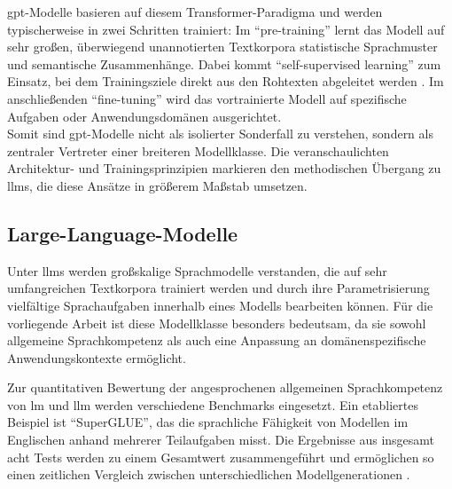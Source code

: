 \gls{gpt}-Modelle basieren auf diesem Transformer-Paradigma und werden typischerweise in zwei Schritten trainiert: 
Im \enquote{pre-training} lernt das Modell auf sehr großen, überwiegend unannotierten Textkorpora statistische Sprachmuster und semantische Zusammenhänge. 
Dabei kommt \enquote{self-supervised learning} zum Einsatz, bei dem Trainingsziele direkt aus den Rohtexten abgeleitet werden \cite{han2021pretrainedmodelspastpresent}. 
Im anschließenden \enquote{fine-tuning} wird das vortrainierte Modell auf spezifische Aufgaben oder Anwendungsdomänen ausgerichtet. \\

Somit sind \gls{gpt}-Modelle nicht als isolierter Sonderfall zu verstehen, sondern als zentraler Vertreter einer breiteren Modellklasse.
Die veranschaulichten Architektur- und Trainingsprinzipien markieren den methodischen Übergang zu \glspl{llm}, die diese Ansätze in größerem Maßstab umsetzen.

\subsection{Large-Language-Modelle}
\label{sec:llm}

Unter \glspl{llm} werden großskalige Sprachmodelle verstanden, die auf sehr umfangreichen Textkorpora trainiert werden und durch ihre Parametrisierung vielfältige Sprachaufgaben innerhalb eines Modells bearbeiten können.
Für die vorliegende Arbeit ist diese Modellklasse besonders bedeutsam, da sie sowohl allgemeine Sprachkompetenz als auch eine Anpassung an domänenspezifische Anwendungskontexte ermöglicht.

Zur quantitativen Bewertung der angesprochenen allgemeinen Sprachkompetenz von \gls{lm} und \gls{llm} werden verschiedene Benchmarks eingesetzt.
Ein etabliertes Beispiel ist \enquote{SuperGLUE}, das die sprachliche Fähigkeit von Modellen im Englischen anhand mehrerer Teilaufgaben misst.
Die Ergebnisse aus insgesamt acht Tests werden zu einem Gesamtwert zusammengeführt und ermöglichen so einen zeitlichen Vergleich zwischen unterschiedlichen Modellgenerationen \cite{wang2020supergluestickierbenchmarkgeneralpurpose}.

